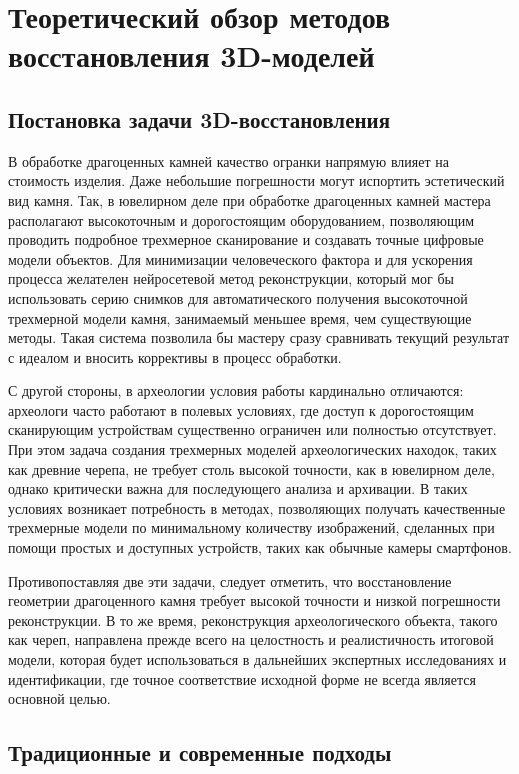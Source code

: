 \chapter{Теоретический обзор методов восстановления 3D-моделей}

\section{Постановка задачи 3D-восстановления}

В обработке драгоценных камней качество огранки напрямую влияет на стоимость
изделия. Даже небольшие погрешности могут испортить эстетический вид камня.
Так, в ювелирном деле при обработке драгоценных камней мастера располагают
высокоточным и дорогостоящим оборудованием, позволяющим проводить подробное
трехмерное сканирование и создавать точные цифровые модели объектов. Для
минимизации человеческого фактора и для ускорения процесса желателен
нейросетевой метод реконструкции, который мог бы использовать серию снимков для
автоматического получения высокоточной трехмерной модели камня, занимаемый
меньшее время, чем существующие методы. Такая система позволила бы мастеру сразу
сравнивать текущий результат с идеалом и вносить коррективы в процесс обработки.

С другой стороны, в археологии условия работы кардинально отличаются: археологи
часто работают в полевых условиях, где доступ к дорогостоящим сканирующим
устройствам существенно ограничен или полностью отсутствует. При этом задача
создания трехмерных моделей археологических находок, таких как древние черепа,
не требует столь высокой точности, как в ювелирном деле, однако критически важна
для последующего анализа и архивации. В таких условиях возникает потребность в
методах, позволяющих получать качественные трехмерные модели по минимальному
количеству изображений, сделанных при помощи простых и доступных устройств,
таких как обычные камеры смартфонов.

Противопоставляя две эти задачи, следует отметить, что восстановление геометрии
драгоценного камня требует высокой точности и низкой погрешности реконструкции. В то же
время, реконструкция археологического объекта, такого как череп, направлена
прежде всего на целостность и реалистичность итоговой модели, которая будет
использоваться в дальнейших экспертных исследованиях и идентификации, где точное
соответствие исходной форме не всегда является основной целью.

\section{Традиционные и современные подходы}


